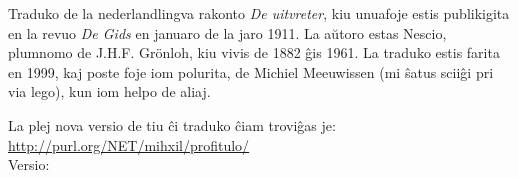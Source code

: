 \noindent
\begin{minipage}[t][0.9\textheight][b]{\textwidth}
    Traduko de la nederlandlingva rakonto {\em De uitvreter}, kiu unuafoje
    estis publikigita en la revuo {\em De Gids} en januaro de la jaro
    1911. La aŭtoro estas Nescio, plumnomo de J.H.F. Gr\"onloh, kiu
    vivis de 1882 ĝis 1961.  La traduko estis farita  en 1999, kaj
    poste foje iom polurita,  de Michiel  Meeuwissen
     (mi ŝatus sciiĝi pri via lego), kun iom helpo de aliaj.

    La plej nova versio de tiu ĉi traduko ĉiam troviĝas je:\\
    \href{http://purl.org/NET/mihxil/profitulo/}{http://purl.org/NET/mihxil/profitulo/}\\

    Versio: \href{https://github.com/mihxil/profitulo/}{}
  \end{minipage}
